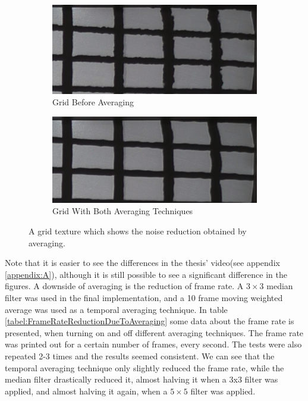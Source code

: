\documentclass[]{article}
\begin{document}
\begin{figure}
\centering
\begin{subfigure}{.5\textwidth}
  \centering
  \includegraphics[width=0.9\linewidth]{figures/NoSmoothingC.png}
  \caption{Grid Before Averaging}
  \label{fig:GridNoAveraging}
\end{subfigure}%
\begin{subfigure}{.5\textwidth}
  \centering
  \includegraphics[width=0.9\linewidth]{figures/BothAveragingTechniquesC.png}
  \caption{Grid With Both Averaging Techniques}
  \label{fig:GridWithAveraging}
\end{subfigure}
\caption{A grid texture which shows the noise reduction obtained by averaging.}
\label{fig:GridNoiseReduction}
\end{figure}

Note that it is easier to see the differences in the thesis' video(see appendix \ref{appendix:A}), although it is still possible to see a significant difference in the figures. A downside of averaging is the reduction of frame rate. A $3 \times 3$ median filter was used in the final implementation, and a 10 frame moving weighted average was used as a temporal averaging technique. In table \ref{tabel:FrameRateReductionDueToAveraging} some data about the frame rate is presented, when turning on and off different averaging techniques. The frame rate was printed out for a certain number of frames, every second. The tests were also repeated 2-3 times and the results seemed consistent. We can see that the temporal averaging technique only slightly reduced the frame rate, while the median filter drastically reduced it, almost halving it when a 3x3 filter was applied, and almost halving it again, when a $5 \times 5$ filter was applied.
\end{document}

